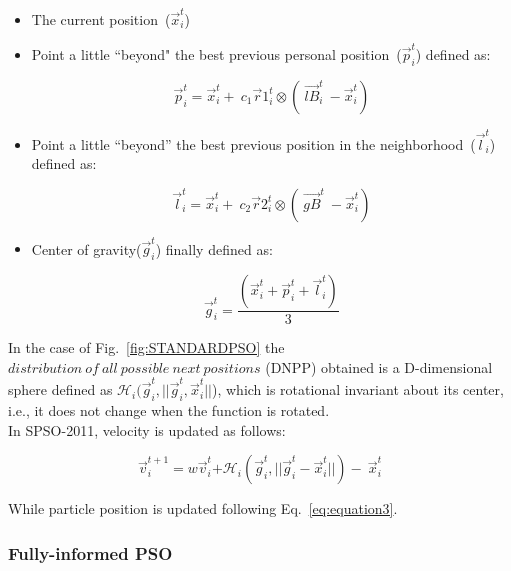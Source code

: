 \begin{itemize}
    \item The current position~(${\vec{x}}_i^t$)
    \item Point a little ``beyond" the best previous personal position~(${\vec{p}}_i^t$) defined as:
    
    \begin{equation}\label{eq:bestpreviouspersonal position}
        {\vec{p}}_i^t={\vec{x}}_i^t+\ c_1{\vec{r}}1_i^t\otimes(\ {\vec{lB}}_i^t\ - {\vec{x}}_i^t)
    \end{equation}
    
    \item Point a little “beyond” the best previous position in the neighborhood~($ {\vec{l}}_i^t$) defined as:

      \begin{equation}\label{eq:best previous position in the neighbourhood}
        {\vec{l}}_i^t={\vec{x}}_i^t+\ c_2{\vec{r}}2_i^t\otimes(\ {\vec{gB}}^t\ - {\vec{x}}_i^t)
    \end{equation}
    
    \item Center of gravity(${\vec{g}}_i^t$) finally defined as:
    
    \begin{equation}\label{eq:gravitycentre}
        {\vec{g}}_i^t=\frac{\left({\vec{x}}_i^t+{\vec{p}}_i^t+{\vec{l}}_i^t\right)}{3}
    \end{equation}
    
\end{itemize}


In the case of Fig.~\ref{fig:STANDARDPSO} the $distribution~of~all~possible~next~positions$ (DNPP) obtained is a D-dimensional sphere defined as $\mathcal{H}_i({\vec{g}}_i^t, ||\vec{g}_i^t,\vec{x}_i^t||$), which is rotational invariant about its center, i.e., it does not change when the function is rotated.\\
In SPSO-2011, velocity is updated as follows:


\begin{equation}
       {\vec{v}}_i^{t+1}=w{\vec{v}}_i^t{+\mathcal{H}}_i({\vec{g}}_i^t,||\vec{g}_i^t - \vec{x}_i^t||)-\ {\vec{x}}_i^t
\end{equation}


While particle position is updated following Eq.~\eqref{eq:equation3}.

\subsubsection{Fully-informed PSO}

